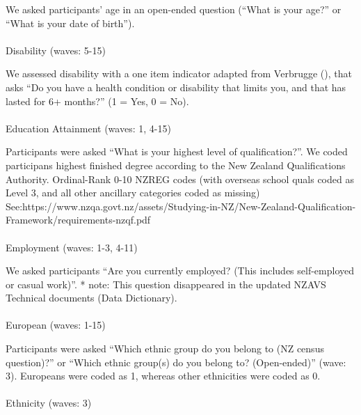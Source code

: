 \documentclass[
  singlecolumn,
  9pt]{scrartcl}
\makeatletter
\let\oldparagraph\paragraph
\renewcommand{\paragraph}{
    \@ifstar
      \xxxParagraphStar
      \xxxParagraphNoStar
  }
\newcommand{\xxxParagraphStar}[1]{\oldparagraph*{#1}\mbox{}}
\newcommand{\xxxParagraphNoStar}[1]{\oldparagraph{#1}\mbox{}}
\makeatother
\begin{document}
We asked participants' age in an open-ended question (``What is your
age?'' or ``What is your date of birth'').

\paragraph{Disability (waves: 5-15)}\label{disability-waves-5-15}

We assessed disability with a one item indicator adapted from Verbrugge
(), that asks ``Do you have a health
condition or disability that limits you, and that has lasted for 6+
months?'' (1 = Yes, 0 = No).

\paragraph{Education Attainment (waves: 1,
4-15)}\label{education-attainment-waves-1-4-15}

Participants were asked ``What is your highest level of
qualification?''. We coded participans highest finished degree according
to the New Zealand Qualifications Authority. Ordinal-Rank 0-10 NZREG
codes (with overseas school quals coded as Level 3, and all other
ancillary categories coded as missing)
See:https://www.nzqa.govt.nz/assets/Studying-in-NZ/New-Zealand-Qualification-Framework/requirements-nzqf.pdf

\paragraph{Employment (waves: 1-3,
4-11)}\label{employment-waves-1-3-4-11}

We asked participants ``Are you currently employed? (This includes
self-employed or casual work)''. * note: This question disappeared in
the updated NZAVS Technical documents (Data Dictionary).

\paragraph{European (waves: 1-15)}\label{european-waves-1-15}

Participants were asked ``Which ethnic group do you belong to (NZ census
question)?'' or ``Which ethnic group(s) do you belong to? (Open-ended)''
(wave: 3). Europeans were coded as 1, whereas other ethnicities were
coded as 0.

\paragraph{Ethnicity (waves: 3)}\label{ethnicity-waves-3}
\end{document}
